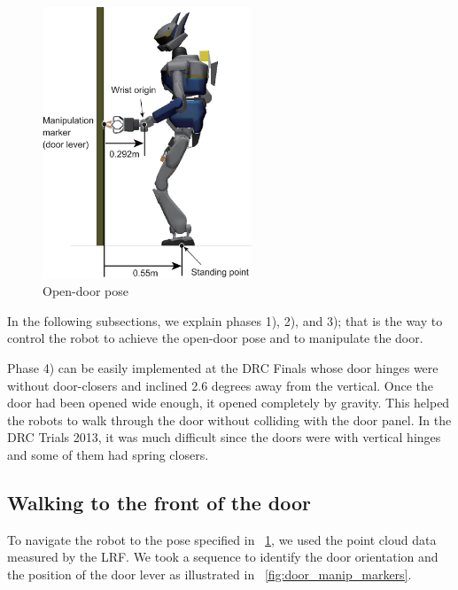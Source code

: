 \begin{figure}[t]
  \centering
  \includegraphics[width = 6.25cm]{img/door_approaching_config}
  \caption{Open-door pose}
  \label{fig:door_approaching_config}
\end{figure}



In the following subsections, we explain phases 1), 2), and 3); that is
the way to control the robot to achieve the open-door pose and to manipulate the door.

Phase 4) can be easily implemented at the DRC Finals whose door hinges were without 
door-closers and inclined 2.6 degrees away from the vertical. Once 
the door had been opened wide enough, it opened completely by gravity.
This helped the robots to walk through the door without colliding with
the door panel.
In the DRC Trials 2013, it was much difficult since the doors were with 
vertical hinges and some of them had spring closers.

\subsection{Walking to the front of the door}
%
To navigate the robot to the pose specified in \figurename~\ref{fig:door_approaching_config},
we used the point cloud data measured by the LRF. 
We took a sequence to identify the door orientation and the position of the
door lever as illustrated in \figurename~\ref{fig:door_manip_markers}.

